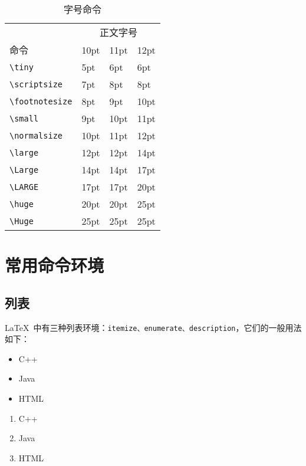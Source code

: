 \begin{table}[htbp]
\centering
\caption{字号命令}
\label{tab:fontsize_command}
\begin{tabular}{llll}
    \toprule
    & \multicolumn{3}{c}{正文字号} \\
    \cmidrule(lr){2-4}
    命令 & 10pt & 11pt & 12pt \\
    \midrule
    \verb|\tiny|         & 5pt  & 6pt  & 6pt \\
    \verb|\scriptsize|   & 7pt  & 8pt  & 8pt \\
    \verb|\footnotesize| & 8pt  & 9pt  & 10pt \\
    \verb|\small|        & 9pt  & 10pt & 11pt \\
    \verb|\normalsize|   & 10pt & 11pt & 12pt \\
    \verb|\large|        & 12pt & 12pt & 14pt \\
    \verb|\Large|        & 14pt & 14pt & 17pt \\
    \verb|\LARGE|        & 17pt & 17pt & 20pt \\
    \verb|\huge|         & 20pt & 20pt & 25pt \\
    \verb|\Huge|         & 25pt & 25pt & 25pt \\
    \bottomrule
\end{tabular}
\end{table}

\section{常用命令环境}
\subsection{列表}

\LaTeX~中有三种列表环境：\verb|itemize、enumerate、description|，它们的一般用法如下：

\begin{demo}
\begin{itemize}
    \item C++
    \item Java
    \item HTML
\end{itemize}
\end{demo}

\begin{demo}
\begin{enumerate}
    \item C++
    \item Java
    \item HTML
\end{enumerate}
\end{demo}

